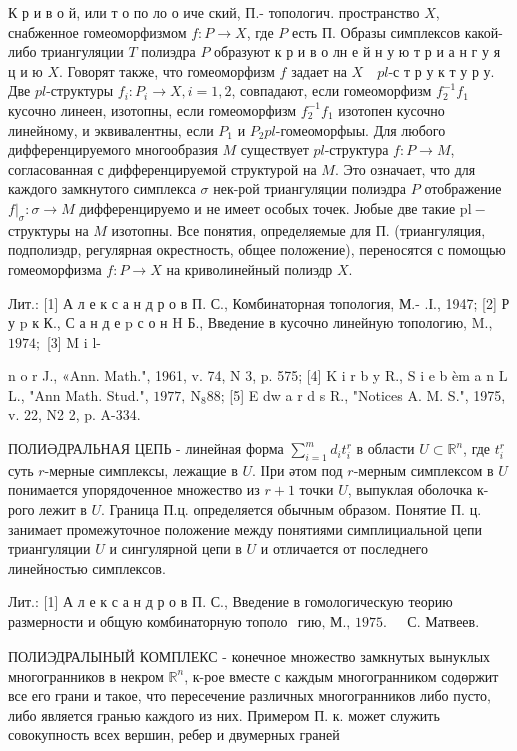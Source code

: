 \documentclass[10pt]{article}
\begin{document}
К р и в о й, или т о по ло о иче ский, П.- топологич. пространство $X$, снабженное гомеоморфизмом $f: P \rightarrow X$, где $P$ есть П. Образы симплексов какой-либо триангуляции $T$ полиэдра $P$ образуют к р и в о лн е й н у ю т р и а н г у я ц и ю $X$. Говорят также, что гомеоморфизм $f$ задает на $X \quad p l$-с т р у к т у р у. Две $p l$-структуры $f_{i}: P_{i} \rightarrow X, i=1,2$, совпадают, если гомеоморфизм $f_{2}^{-1} f_{1}$ кусочно линеен, изотопны, если гомеоморфизм $f_{2}^{-1} f_{1}$ изотопен кусочно линейному, и эквивалентны, если $P_{1}$ и $P_{2} p l$-гомеоморфыы. Для любого дифференцируемого многообразия $M$ существует $p l$-структура $f: P \rightarrow M$, согласованная с дифференцируемой структурой на $M$. Это означает, что для каждого замкнутого симплекса $\sigma$ нек-рой триангуляции полиэдра $P$ отображение $\left.f\right|_{\sigma}: \sigma \rightarrow M$ дифференцируемо и не имеет особых точек. Јюбые две такие $\mathrm{pl}-$ структуры на $M$ изотопны. Все понятия, определяемые для П. (триангуляция, подполиэдр, регулярная окрестность, общее положение), переносятся с помощью гомеоморфизма $f: P \rightarrow X$ на криволинейный полиэдр $X$.



Лит.: [1] А л е к с а н д р о в П. С., Комбинаторная топология, М.- .І., 1947; [2] Р у $\mathrm{p}$ к К., С а н д е p с о н $\mathrm{H}$ Б., Введение в кусочно линейную топологию, M., $1974 ;$ [3] M i l-

n o r J., «Ann. Math.", 1961, v. 74, N 3, p. 575; [4] K i r b y R., $\mathrm{S}$ i e b èm a n $\mathrm{L}$ L., "Ann Math. Stud.", $1977, \mathrm{~N}_{8} 88$; [5] E dw a r d s R., "Notices A. M. S.", 1975, v. 22, N2 2, p. A-334.



ПОЛИӘДРАЛЬНАЯ ЦЕПЬ - линейная форма $\sum_{i=1}^{m} d_{i} t_{i}^{r}$ в области $U \subset \mathbb{R}^{n}$, где $t_{i}^{r}$ суть $r$-мерные симплексы, лежащие в $U$. ІІри әтом под $r$-мерным симплексом в $U$ понимается упорядоченное множество из $r+1$ точки $U$, выпуклая оболочка к-рого лежит в $U$. Граница П.ц. определяется обычным образом. Понятие П. ц. занимает промежуточное положение между понятиями симплициальной цепи триангуляции $U$ и сингулярной цепи в $U$ и отличается от последнего линейностью симплексов.



Лит.: [1] А л е к с а н д р о в П. С., Введение в гомологическую теорию размерности и общую комбинаторную тополо$\begin{array}{ll}\text { гию, М., } 1975 \text {. } & \text { С. Матвеев. }\end{array}$



ПОЛИЭДРАЛЫНЫЙ КОМПЛЕКС - конечное множество замкнутых вынуклых многогранников в некром $\mathbb{R}^{n}$, к-рое вместе с каждым многогранником содөржит все его грани и такое, что пересечение различных многогранников либо пусто, либо является гранью каждого из них. Примером П. к. может служить совокупность всех вершин, ребер и двумерных граней
\end{document}
